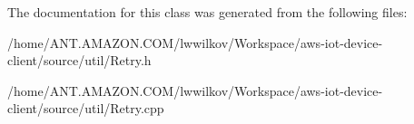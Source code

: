 The documentation for this class was generated from the following files\+:\begin{DoxyCompactItemize}
\item 
/home/\+A\+N\+T.\+A\+M\+A\+Z\+O\+N.\+C\+O\+M/lwwilkov/\+Workspace/aws-\/iot-\/device-\/client/source/util/Retry.\+h\item 
/home/\+A\+N\+T.\+A\+M\+A\+Z\+O\+N.\+C\+O\+M/lwwilkov/\+Workspace/aws-\/iot-\/device-\/client/source/util/Retry.\+cpp\end{DoxyCompactItemize}
